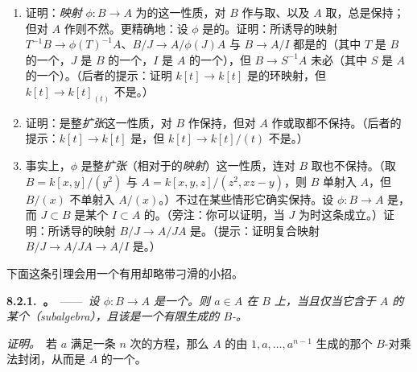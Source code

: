 \begin{exercise}\label{ex:integrality-localization-quotient}
\begin{enumerate}[label=(\alph*)]
\item 证明：\emph{映射} $\phi\colon B\to A$ 为\trIntegral{}的这一性质，对 $B$ 作\trLocalization{}与取\trQuotient、以及 $A$ 取\trQuotient，总是保持；但对 $A$ 作\trLocalization{}则不然。更精确地：设 $\phi$ 是\trIntegral{}的。证明：所诱导的映射 $T^{-1}B\to\phi(T)^{-1}A$、$B/J\to A/\phi(J)A$ 与 $B\to A/I$ 都是\trIntegral{}的（其中 $T$ 是 $B$ 的一个\trMultiplicativeSubset，$J$ 是 $B$ 的一个\trIdeal，$I$ 是 $A$ 的一个\trIdeal），但 $B\to S^{-1}A$ 未必\trIntegral（其中 $S$ 是 $A$ 的一个\trMultiplicativeSubset）。（后者的提示：证明 $k[t]\to k[t]$ 是\trIntegral{}的环映射，但 $k[t]\to k[t]_{(t)}$ 不是。）
\item 证明：是整\emph{扩张}这一性质，对 $B$ 作\trLocalization{}保持，但对 $A$ 作\trLocalization{}或取\trQuotient{}都不保持。（后者的提示：$k[t]\to k[t]$ 是\trIntegralExtension{}，但 $k[t]\to k[t]/(t)$ 不是。）
\item 事实上，$\phi$ 是整\emph{扩张}（相对于\trIntegral{}的\emph{映射}）这一性质，连对 $B$ 取\trQuotient{}也不保持。（取 $B=k[x,y]/(y^2)$ 与 $A=k[x,y,z]/(z^2,xz-y)$，则 $B$ 单射入 $A$，但 $B/(x)$ 不单射入 $A/(x)$。）不过在某些情形它确实保持。设 $\phi\colon B\to A$ 是\trIntegralExtension{}，而 $J\subset B$ 是某个\trIdeal{} $I\subset A$ 的\trRestriction{}。（旁注：你可以证明，当 $J$ 为\trPrimeIdeal{}时这条成立。）证明：所诱导的映射 $B/J\to A/JA$ 是\trIntegralExtension{}。（提示：证明复合映射 $B/J\to A/JA\to A/I$ 是\trInjectiveMap。）
\end{enumerate}
\end{exercise}

下面这条引理会用一个有用却略带刁滑的小招。

\textbf{8.2.1.\ \trhLemma{}。}\ ——\ \emph{设 $\phi\colon B\to A$ 是一个\trRingMorphism。则 $a\in A$ 在 $B$ 上\trIntegral，当且仅当它含于 $A$ 的某个\trSubalgebra{}（subalgebra），且该\trSubalgebra{}是一个有限生成的 $B$-\trModule。}%

\emph{证明。}\ 若 $a$ 满足一条 $n$ 次的\trMonicPolynomial{}方程，那么 $A$ 的由 $1,a,\dots,a^{n-1}$ 生成的那个 $B$-\trSubmodule{}对乘法封闭，从而是 $A$ 的一个\trSubalgebra{}。

